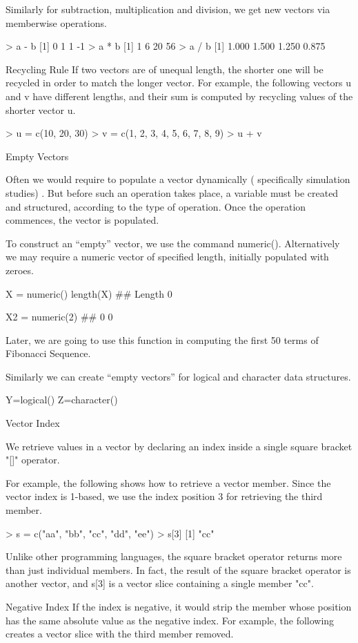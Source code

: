 \begin{itemize}
\begin{frame}
Similarly for subtraction, multiplication and division, we get new vectors via memberwise operations.

> a - b 
[1]  0  1  1 -1 
> a * b 
[1]  1  6 20 56 
> a / b 
[1] 1.000 1.500 1.250 0.875

Recycling Rule
If two vectors are of unequal length, the shorter one will be recycled in order to match the longer vector. For example, the following vectors u and v have different lengths, and their sum is computed by recycling values of the shorter vector u.

> u = c(10, 20, 30) 
> v = c(1, 2, 3, 4, 5, 6, 7, 8, 9) 
> u + v 

Empty Vectors

Often we would require to populate a vector dynamically ( specifically simulation studies) . But before such an operation takes place,  a variable must be created and structured, according to the type of operation. Once the operation commences, the vector is populated. 

To construct an “empty” vector, we use the command numeric(). Alternatively we may require a numeric vector of specified length, initially populated with zeroes.

X =  numeric()
length(X)
## Length 0

X2 =  numeric(2)
## 0 0 

Later, we are going to use this function in computing the first 50 terms of Fibonacci Sequence.

Similarly we can create “empty vectors” for logical and character data structures.

Y=logical()
Z=character()

Vector Index

We retrieve values in a vector by declaring an index inside a single square bracket "[]" operator.

For example, the following shows how to retrieve a vector member. Since the vector index is 1-based, we use the index position 3 for retrieving the third member.

> s = c("aa", "bb", "cc", "dd", "ee") 
> s[3] 
[1] "cc"

Unlike other programming languages, the square bracket operator returns more than just individual members. In fact, the result of the square bracket operator is another vector, and s[3] is a vector slice containing a single member "cc".

Negative Index
If the index is negative, it would strip the member whose position has the same absolute value as the negative index. For example, the following creates a vector slice with the third member removed.


\end{frame}
\end{itemize}

